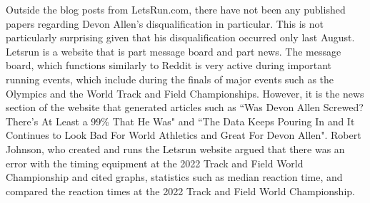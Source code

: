 \documentclass[12pt, letterpaper, titlepage]{article}
\begin{document}
Outside the blog posts from LetsRun.com, there have not been any published
papers regarding Devon Allen's disqualification in particular.  This is not
particularly surprising given that his disqualification occurred only last August.
Letsrun is a website that is part message board and part news.  The message board,
which functions similarly to Reddit is very active during important running
events, which include during the finals of major events such as
the Olympics and the World Track and Field Championships.  However, it is the
news section of the website that generated articles such as ``Was Devon Allen
Screwed? There's At Least a 99\% That He Was" and ``The Data Keeps Pouring In and
It Continues to Look Bad For World Athletics and Great For Devon Allen".  Robert
Johnson, who created and runs the Letsrun website argued that there was an error
with the timing equipment at the 2022 Track and Field World Championship and
cited graphs, statistics such as median reaction time, and compared the reaction
times at the 2022 Track and Field World Championship.  
\end{document}

